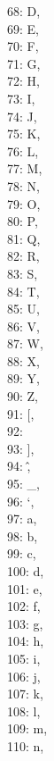 \documentclass{article}
\begin{document}
{\begin{tabbing}
68: D, \\
69: E, \\
70: F, \\
71: G, \\
72: H, \\
73: I, \\
74: J, \\
75: K, \\
76: L, \\
77: M, \\
78: N, \\
79: O, \\
80: P, \\
81: Q, \\
82: R, \\
83: S, \\
84: T, \\
85: U, \\
86: V, \\
87: W, \\
88: X, \\
89: Y, \\
90: Z, \\
91: [, \\
92: \, \\
93: ], \\
94: \^, \\
95: \_, \\
96: `, \\
97: a, \\
98: b, \\
99: c, \\
100: d, \\
101: e, \\
102: f, \\
103: g, \\
104: h, \\
105: i, \\
106: j, \\
107: k, \\
108: l, \\
109: m, \\
110: n, \\

\end{tabbing}}
\end{document}
